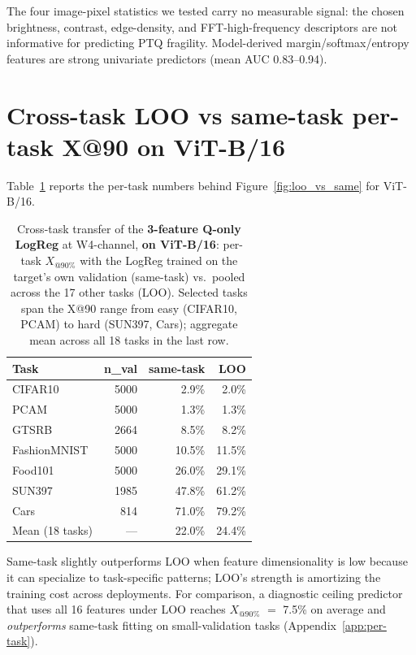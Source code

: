 \documentclass{article}
\makeatletter
\newcommand{\ptq}{\textsc{PTQ}\xspace}
\newcommand{\xat}[1]{\ensuremath{X_{@#1\%}}}
\makeatother
\begin{document}
The four image-pixel statistics we tested carry no measurable signal: the chosen brightness, contrast, edge-density, and FFT-high-frequency descriptors are not informative for predicting \ptq{} fragility. Model-derived margin/softmax/entropy features are strong univariate predictors (mean AUC 0.83--0.94).

\section{Cross-task LOO vs same-task per-task X@90 on ViT-B/16}\label{app:loo_per_task}

Table~\ref{tab:loo} reports the per-task numbers behind Figure~\ref{fig:loo_vs_same} for ViT-B/16.

\begin{table}[t]
\centering
\caption{Cross-task transfer of the \textbf{3-feature Q-only LogReg} at W4-channel, \textbf{on ViT-B/16}: per-task \xat{90} with the LogReg trained on the target's own validation (same-task) vs.\ pooled across the 17 other tasks (LOO). Selected tasks span the X@90 range from easy (CIFAR10, PCAM) to hard (SUN397, Cars); aggregate mean across all 18 tasks in the last row.}
\label{tab:loo}
\small
\begin{tabular}{lrrr}
\toprule
Task & n\_val & same-task & LOO \\
\midrule
CIFAR10       & 5000 & 2.9\%  & 2.0\%  \\
PCAM          & 5000 & 1.3\%  & 1.3\%  \\
GTSRB         & 2664 & 8.5\%  & 8.2\%  \\
FashionMNIST  & 5000 & 10.5\% & 11.5\% \\
Food101       & 5000 & 26.0\% & 29.1\% \\
SUN397        & 1985 & 47.8\% & 61.2\% \\
Cars          & 814  & 71.0\% & 79.2\% \\
\midrule
Mean (18 tasks) & --- & 22.0\% & 24.4\% \\
\bottomrule
\end{tabular}
\end{table}

Same-task slightly outperforms LOO when feature dimensionality is low because it can specialize to task-specific patterns; LOO's strength is amortizing the training cost across deployments. For comparison, a diagnostic ceiling predictor that uses all 16 features under LOO reaches \xat{90} $=$ 7.5\% on average and \emph{outperforms} same-task fitting on small-validation tasks (Appendix~\ref{app:per-task}).
\end{document}
